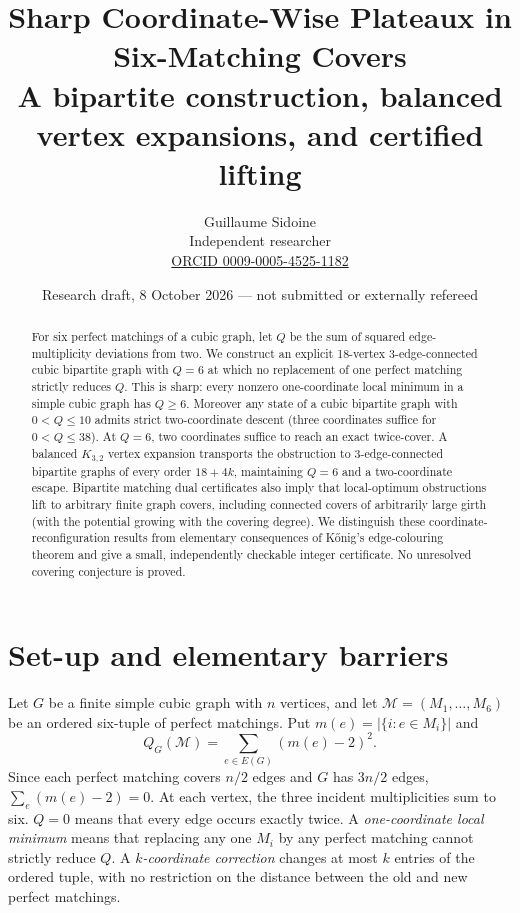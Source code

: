 \documentclass[11pt]{article}
\title{Sharp Coordinate-Wise Plateaux in Six-Matching Covers\\
\large A bipartite construction, balanced vertex expansions, and certified lifting}
\author{Guillaume Sidoine\\Independent researcher\\
\href{https://orcid.org/0009-0005-4525-1182}{ORCID 0009-0005-4525-1182}}
\date{Research draft, 8 October 2026 --- not submitted or externally refereed}
\begin{document}
\maketitle
\begin{abstract}
For six perfect matchings of a cubic graph, let $Q$ be the sum of squared
edge-multiplicity deviations from two. We construct an explicit 18-vertex
3-edge-connected cubic bipartite graph with $Q=6$ at which no replacement
of one perfect matching strictly reduces $Q$. This is sharp: every
nonzero one-coordinate local minimum in a simple cubic graph has $Q\ge6$.
Moreover any state of a cubic bipartite graph with $0<Q\le10$
admits strict two-coordinate descent (three coordinates suffice for
$0<Q\le38$). At $Q=6$, two coordinates suffice to reach an exact twice-cover.
A balanced $K_{3,2}$ vertex expansion transports the obstruction to
3-edge-connected bipartite graphs of every order $18+4k$, maintaining
$Q=6$ and a two-coordinate escape. Bipartite matching dual certificates
also imply that local-optimum obstructions lift to arbitrary finite graph
covers, including connected covers of arbitrarily large girth (with the
potential growing with the covering degree). We distinguish these
coordinate-reconfiguration results from elementary consequences of
K\H onig's edge-colouring theorem and give a small, independently
checkable integer certificate. No unresolved covering conjecture is proved.
\end{abstract}

\section{Set-up and elementary barriers}
Let $G$ be a finite simple cubic graph with $n$ vertices, and let
$\mathcal M=(M_1,\ldots,M_6)$ be an ordered six-tuple of perfect matchings.
Put $m(e)=|\{i:e\in M_i\}|$ and
\[
 Q_G(\mathcal M)=\sum_{e\in E(G)}(m(e)-2)^2.
\]
Since each perfect matching covers $n/2$ edges and $G$ has $3n/2$
edges, $\sum_e(m(e)-2)=0$. At each vertex, the three incident
multiplicities sum to six. $Q=0$ means that every edge occurs exactly
twice. A \emph{one-coordinate local minimum} means that replacing any
one $M_i$ by any perfect matching cannot strictly reduce $Q$.
A \emph{$k$-coordinate correction} changes at most $k$ entries of the
ordered tuple, with no restriction on the distance between the old
and new perfect matchings.
\end{document}
